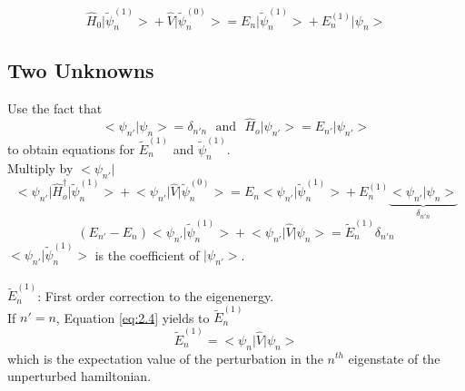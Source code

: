 \documentclass[12pt]{article}
\begin{document}
\begin{equation}
  \label{eq:2.3}
	\hat{H}_0 \big|\tilde{\psi}^{(1)}_n \big> + 
	\hat{V}\big| \tilde{\psi}^{(0)}_n \big> = 
	E_n \big|\tilde{\psi}^{(1)}_n \big> + E^{(1)}_n \big|\psi_n \big> 
\end{equation}
\subsection{Two Unknowns}

Use the fact that
\[\big< \psi_{n'} \big| \psi_n\big> = \delta_{n'n}\,\,\,\,\text{and}\,\,\,\,\hat{H}_o \big|\psi_{n'}
\big> = E_{n'} \big | \psi_{n'} \big>\]
to obtain equations for $\tilde{E}^{(1)}_n$ and $\tilde{\psi}^{(1)}_n$.\\

Multiply by $\big< \psi_{n'} \big|$ 
\begin{equation*}
	\big< \psi_{n'} \big|\hat{H}^\dag_o \big|\tilde{\psi}^{(1)}_n \big> + 
	\big< \psi_{n'} \big|\hat{V}\big| \tilde{\psi}^{(0)}_n \big> = 
	E_n \big< \psi_{n'} \big|\tilde{\psi}^{(1)}_n \big> + E^{(1)}_n \underbrace{\big< \psi_{n'}
	\big|\psi_n \big>}_{\delta_{n'n}} 
\end{equation*}
\begin{equation}
\label{eq:2.4}
	\left(E_{n'} - E_n\right)\big< \psi_{n'} \big|\tilde{\psi}^{(1)}_n \big> +
	\big< \psi_{n'} \big|\hat{V}\big| \psi_n \big> = \tilde{E}^{(1)}_n \delta_{n'n}
\end{equation}
$\big< \psi_{n'} \big|\tilde{\psi}^{(1)}_n \big>  $ is the coefficient of $\big|\psi_{n'} \big>$.\\
\\
$\tilde{E}^{(1)}_n $: First order correction to the eigenenergy.\\

If $n'=n$, Equation \ref{eq:2.4} yields to $\tilde{E}^{{(1)}}_n$ 
\begin{equation*}
	\boxed{\tilde{E}^{(1)}_n =	\big< \psi_{n} \big|\hat{V}\big| \psi_n \big>  }
\end{equation*}
which is the expectation value of the perturbation in the $n^{th}$ eigenstate of the unperturbed hamiltonian.
\\
\end{document}
